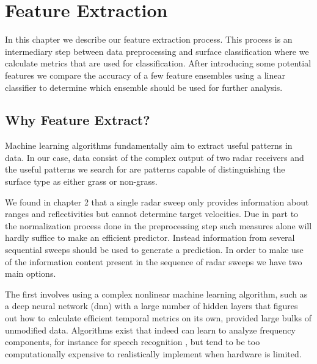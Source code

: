
\chapter{Feature Extraction}

In this chapter we describe our feature extraction process. This process is an intermediary step between data preprocessing and surface classification where we calculate metrics that are used for classification. After introducing some potential features we compare the accuracy of a few feature ensembles using a linear classifier to determine which ensemble should be used for further analysis.  

\section{Why Feature Extract?}

Machine learning algorithms fundamentally aim to extract useful patterns in data. In our case, data consist of the complex output of two radar receivers and the useful patterns we search for are patterns capable of distinguishing the surface type as either grass or non-grass. %

We found in chapter 2 that a single radar sweep only provides information about ranges and reflectivities but cannot determine target velocities. Due in part to the normalization process done in the preprocessing step such measures alone will hardly suffice to make an efficient predictor. Instead information from several sequential sweeps should be used to generate a prediction. In order to make use of the information content present in the sequence of radar sweeps we have two main options. 

The first involves using a complex nonlinear machine learning algorithm, such as a deep neural network (\gls{dnn}) with a large number of hidden layers that figures out how to calculate efficient temporal metrics on its own, provided large bulks of unmodified data. Algorithms exist that indeed can learn to analyze frequency components, for instance for speech recognition \citep{graves_mohamed_hinton_2013}, but tend to be too computationally expensive to realistically implement when hardware is limited.

